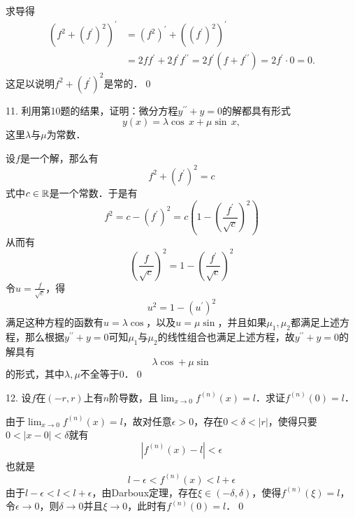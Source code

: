 \prove 求导得
\begin{align}
    \left(f^2 + \left(f^\prime\right)^2\right)^\prime &= \left(f^2\right)^\prime + \left(\left(f^\prime\right)^2\right)^\prime \\
    &= 2 f f^\prime + 2 f^\prime f^{\prime\prime} = 2f^\prime \left(f+f^{\prime\prime}\right) = 2f^\prime \cdot 0 = 0.
\end{align}
这足以说明$f^2 + \left(f^\prime\right)^2$是常的．\qed\bigskip

11. 利用第10题的结果，证明：微分方程$y^{\prime\prime}+y=0$的解都具有形式
\begin{equation}
    y(x) = \lambda \cos \, x + \mu \sin \, x,
\end{equation}
这里$\lambda$与$\mu$为常数．

\solve 设$f$是一个解，那么有
\begin{equation}
    f^2 + \left(f^\prime\right)^2 = c
\end{equation}
式中$c \in \mathbb{R}$是一个常数．于是有
\begin{equation}
    f^2 = c - \left(f^\prime\right)^2 = c \left(1 - \left(\frac{f^\prime}{\sqrt{c}}\right)^2\right)
\end{equation}
从而有
\begin{equation}
    \left(\frac{f}{\sqrt{c}}\right)^2 = 1 - \left(\frac{f^\prime}{\sqrt{c}}\right)^2
\end{equation}
令$u = \displaystyle\frac{f}{\sqrt{c}}$，得
\begin{equation}
    u^2 = 1 - \left(u^\prime\right)^2
\end{equation}
满足这种方程的函数有$u = \lambda \cos$，以及$u = \mu \sin$，并且如果$\mu_1, \mu_2$都满足上述方程，那么根据$y^{\prime\prime}+y = 0$可知$\mu_1$与$\mu_2$的线性组合也满足上述方程，故$y^{\prime\prime}+y=0$的解具有
\begin{equation}
    \lambda \cos + \mu \sin
\end{equation}
的形式，其中$\lambda, \mu$不全等于$0$．\qed\bigskip

12. 设$f$在$(-r,r)$上有$n$阶导数，且$\displaystyle\lim_{x \to 0} f^{(n)}(x) = l$．求证$f^{(n)}(0)=l$．

由于$\displaystyle\lim_{x \to 0} f^{(n)}(x) = l$，故对任意$\epsilon > 0$，存在$0 < \delta < \lvert r \rvert$，使得只要$0 < \left| x - 0 \right| < \delta$就有
\begin{equation}
    \left| f^{(n)} (x) - l \right| < \epsilon
\end{equation}
也就是
\begin{equation}
    l - \epsilon < f^{(n)}(x) < l + \epsilon
\end{equation}
由于$l-\epsilon < l < l + \epsilon$，由Darboux定理，存在$\xi \in (-\delta, \delta)$，使得$f^{(n)}(\xi) = l$，令$\epsilon \to 0$，则$\delta \to 0$并且$\xi \to 0$，此时有$f^{(n)}(0) = l$．\qed\bigskip